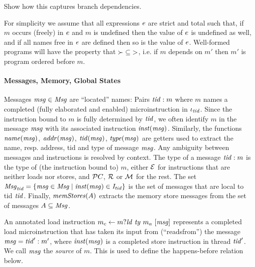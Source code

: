\begin{example}
Show how this captures branch dependencies.
\end{example}


For simplicity we assume that all expressions $\expr$ are strict and total such that, if $m$ occurs (freely) in $\expr$ and $m$ is undefined then the value of $\expr$ is undefined as well, and if all names free in $\expr$ are defined then so is the value of $\expr$. Well-formed programs will have the property that $\mbox{$\depends$}\subseteq \mbox{$>$}$, i.e. if $m$ depends on $m'$ then $m'$ is program ordered before $m$.



\paragraph{Messages, Memory, Global States}
%
Messages $\msgvar\in\Msg$ are ``located'' names: Pairs $\tid:m$ where $m$ names a completed (fully elaborated and enabled) microinstruction in $\inst_\tid$. Since the instruction bound to $m$ is fully determined by $\tid$, we often identify $m$ in the message $\msgvar$ with its associated instruction $\theInst(\msgvar)$. Similarly, the functions $\theName(\msgvar)$, $\theAddress(\msgvar)$, $\theTid(\msgvar)$, $\theType(\msgvar)$ are getters used to extract the name, resp. address, tid and type of message $\msgvar$. Any ambiguity between messages and instructions is resolved by context. The type of a message $\tid:m$ is the type of (the instruction bound to) $m$, either $\exetype$ for instructions that are neither loads nor stores, and $\pctype$, $\regtype$ or $\memtype$ for the rest. 
The set $\Msg_\tid=\{\msgvar\in\Msg \mid \theInst(\msgvar) \in \Dec_\tid\}$ 
is the set of messages that are local to tid $\tid$. Finally, $\theMemStores(A)$ extracts the memory store messages from the set of messages $A\subseteq\Msg$.

An annotated load instruction $\ass{m}{m_c}{\loadsrc{\type}{m_a}{\msgvar}}$ represents a completed load microinstruction that has taken its input
from (``readsfrom'') the message $\msgvar = \tid':m'$, where $\theInst(\msgvar)$ is a completed store instruction in thread $\tid'$. We call $\msgvar$ the \emph{source} of $m$. This is used to define the happens-before relation below.

